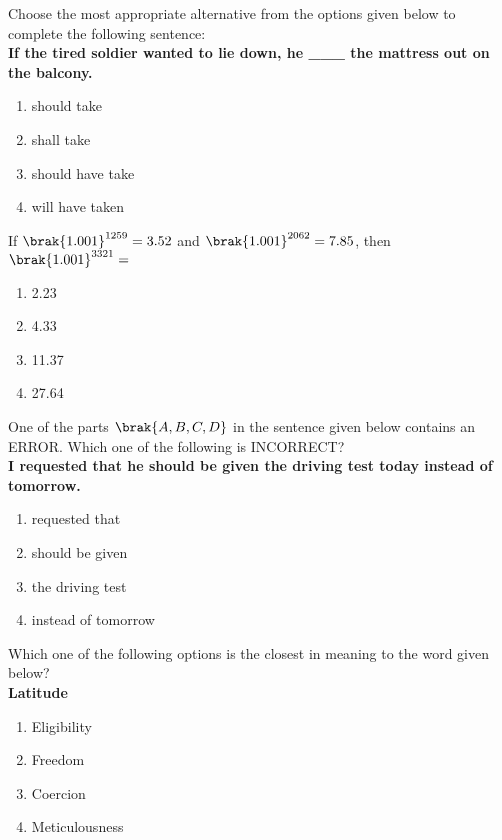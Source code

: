     \item {Choose the most appropriate alternative from the options given below to complete the following
    sentence: \\ \textbf{
    If the tired soldier wanted to lie down, he \_\_\_ the mattress out on the balcony.}
    \begin{multicols}{4}
    	\begin{enumerate}
    		\item should take 
    		\item shall take
    		\item should have take
    		\item will have taken
    	\end{enumerate}
    \end{multicols}}    
    \item {If $\brak{1.001}^{1259} = 3.52$ and $\brak{1.001}^{2062} = 7.85$, then $\brak{1.001}^{3321} =$
    	\begin{multicols}{4}
	    	\begin{enumerate}
	    		\item 2.23 
	    		\item 4.33 
	    		\item 11.37 
	    		\item 27.64
	    	\end{enumerate}
    	\end{multicols}}    
    \item {One of the parts $\brak{A, B, C, D}$ in the sentence given below contains an ERROR. Which one of the
    following is INCORRECT? \\ 
    \textbf{I requested that he should be given the driving test today instead of tomorrow.}
        \begin{multicols}{2}
	    	\begin{enumerate}
				\item requested that
				\item should be given
				\item the driving test
				\item instead of tomorrow
	    	\end{enumerate}
    	\end{multicols}
	}
    \item {Which one of the following options is the closest in meaning to the word given below?\\
    \textbf{Latitude}
    	\begin{multicols}{4}
    		\begin{enumerate}
    			\item Eligibility
    			\item Freedom
    			\item Coercion
    			\item Meticulousness
    		\end{enumerate}
    	\end{multicols}
    
	}
